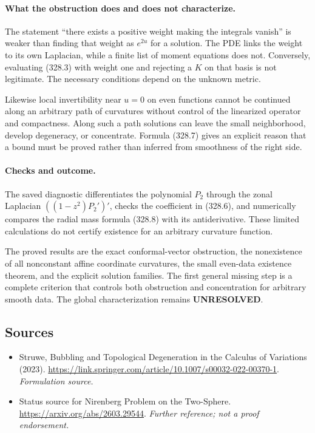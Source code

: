\documentclass[11pt]{article}
\begin{document}
\paragraph{What the obstruction does and does not characterize.}
The statement ``there exists a positive weight making the integrals
vanish'' is weaker than finding that weight as $e^{2u}$ for a
solution. The PDE links the weight to its own Laplacian, while a
finite list of moment equations does not. Conversely, evaluating
(328.3) with weight one and rejecting a $K$ on that basis is not
legitimate. The necessary conditions depend on the unknown metric.

Likewise local invertibility near $u=0$ on even functions cannot be
continued along an arbitrary path of curvatures without control of
the linearized operator and compactness. Along such a path solutions
can leave the small neighborhood, develop degeneracy, or concentrate.
Formula (328.7) gives an explicit reason that a bound must be proved
rather than inferred from smoothness of the right side.

\paragraph{Checks and outcome.}
The saved diagnostic differentiates the polynomial $P_2$ through
the zonal Laplacian $((1-z^2)P_2')'$, checks the coefficient in
(328.6), and numerically compares the radial mass formula (328.8)
with its antiderivative. These limited calculations do not certify
existence for an arbitrary curvature function.

The proved results are the exact conformal-vector obstruction,
the nonexistence of all nonconstant affine coordinate curvatures,
the small even-data existence theorem, and the explicit solution
families. The first general missing step is a complete criterion
that controls both obstruction and concentration for arbitrary
smooth data. The global characterization remains \textbf{UNRESOLVED}.
\subsection{Sources}
\begin{itemize}
\item[S1]Struwe, Bubbling and Topological Degeneration in the Calculus of Variations (2023).
\url{https://link.springer.com/article/10.1007/s00032-022-00370-1}.
\textit{Formulation source.}
\item[S2]Status source for Nirenberg Problem on the Two-Sphere.
\url{https://arxiv.org/abs/2603.29544}.
\textit{Further reference; not a proof endorsement.}
\end{itemize}
\end{document}
